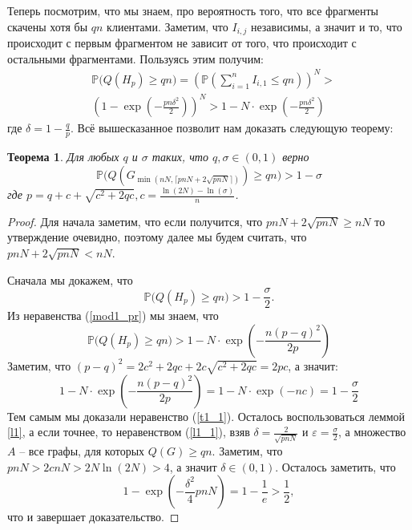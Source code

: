 \documentclass[10pt]{article}
\newcommand{\PRob}{\mathbb P}
\newcommand{\leqs}{\leqslant}
\newcommand{\geqs}{\geqslant}
\newcommand{\eps}{\varepsilon}
\newtheorem{theorem}{Теорема}
\theoremstyle{named}
\begin{document}
Теперь посмотрим, что мы знаем, про вероятность того, что все фрагменты скачены хотя бы $qn$ клиентами.
Заметим, что $I_{i,j}$ независимы, а значит и то, что происходит с первым фрагментом не зависит от того, 
что происходит с остальными фрагментами. Пользуясь этим получим:
\begin{equation}\label{mod1_pr}\begin{aligned}
&\PRob\big(Q(H_p) \geqs q n\big) = \left( \PRob\left(\sum_{i=1}^n I_{i,1} \leqs qn\right)  \right)^N >
\\
&\left( 1 - \exp\left(- \frac{pn \delta^2}{2} \right) \right)^N > 1 - N \cdot \exp\left(- \frac{pn \delta^2}{2} \right) 
\end{aligned}\end{equation}
где $\delta = 1 - \frac{q}{p}$. Всё вышесказанное позволит нам доказать следующую теорему:

\begin{theorem}\label{t1}
Для любых $q$ и $\sigma$ таких, что $q, \sigma \in (0,1)$ верно
\begin{equation}
\PRob\big(Q(G_{\min(nN, \lceil pnN + 2\sqrt{pnN} \rceil)}) \geqs qn\big) > 1 - \sigma
\end{equation}
где $p = q + c + \sqrt{c^2+2qc}, c = \frac{\ln(2N) - \ln(\sigma)}{n}$.
\end{theorem}
\begin{proof}
Для начала заметим, что если получится, что $pnN + 2\sqrt{pnN} \geqs nN$ то утверждение очевидно, 
поэтому далее мы будем считать, что $pnN + 2\sqrt{pnN} < nN$.

Сначала мы докажем, что 
\begin{equation}\label{t1_1}
\PRob\big(Q(H_p) \geqs qn \big) > 1 - \frac\sigma{2}.
\end{equation}
Из неравенства (\ref{mod1_pr}) мы знаем, что 
\begin{equation}
\PRob\big(Q(H_p) \geqs qn \big) > 1 - N \cdot \exp\left(- \frac{n (p-q)^2}{2p} \right)
\end{equation}
Заметим, что $(p-q)^2 = 2c^2 + 2qc + 2c\sqrt{c^2 + 2qc} = 2pc$, а значит:
\begin{equation}
1 - N \cdot \exp\left(- \frac{n (p-q)^2}{2p} \right) = 1 - N \cdot \exp(-nc) = 1 - \frac\sigma{2}
\end{equation}
Тем самым мы доказали неравенство (\ref{t1_1}).
Осталось воспользоваться леммой \ref{l1}, а если точнее, то неравенством (\ref{l1_1}), взяв $\delta = \frac{2}{\sqrt{pnN}}$
 и $\eps = \frac\sigma{2}$, а множество $A$ -- все графы, для которых $Q(G) \geqs qn$.
Заметим, что $pnN > 2cnN> 2N\ln(2N) > 4$, а значит $\delta \in (0,1)$. Осталось заметить, что 
\begin{equation}
1 - \exp\left(-\frac{\delta^2}{4}pnN\right) = 1 - \frac{1}{e} > \frac{1}{2},
\end{equation}
что и завершает доказательство.
\end{proof}
\end{document}
